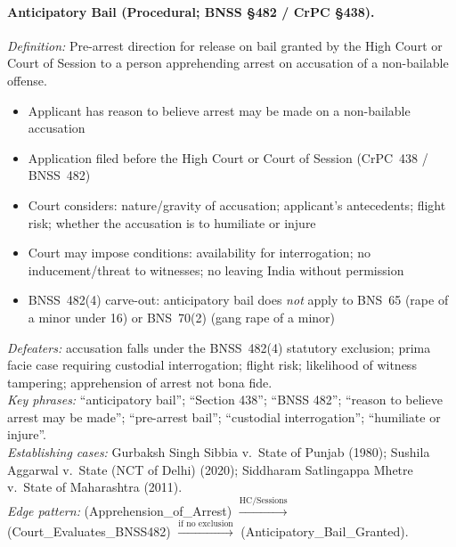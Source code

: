 \documentclass[11pt]{article}
\begin{document}
\paragraph{Anticipatory Bail (Procedural; BNSS \S482 / CrPC \S438).}
\textit{Definition:} Pre-arrest direction for release on bail granted by the High Court or Court of Session to a person apprehending arrest on accusation of a non-bailable offense.
\begin{itemize}[nosep,leftmargin=*]
  \item[\textsc{and}] Applicant has reason to believe arrest may be made on a non-bailable accusation
  \item[\textsc{and}] Application filed before the High Court or Court of Session (CrPC~438 / BNSS~482)
  \item[\textsc{and}] Court considers: nature/gravity of accusation; applicant's antecedents; flight risk; whether the accusation is to humiliate or injure
  \item[\textsc{and}] Court may impose conditions: availability for interrogation; no inducement/threat to witnesses; no leaving India without permission
  \item[\textsc{and}] BNSS~482(4) carve-out: anticipatory bail does \emph{not} apply to BNS~65 (rape of a minor under 16) or BNS~70(2) (gang rape of a minor)
\end{itemize}
\textit{Defeaters:} accusation falls under the BNSS~482(4) statutory exclusion; prima facie case requiring custodial interrogation; flight risk; likelihood of witness tampering; apprehension of arrest not bona fide.\\
\textit{Key phrases:} ``anticipatory bail''; ``Section 438''; ``BNSS 482''; ``reason to believe arrest may be made''; ``pre-arrest bail''; ``custodial interrogation''; ``humiliate or injure''.\\
\textit{Establishing cases:} Gurbaksh Singh Sibbia v.\ State of Punjab (1980); Sushila Aggarwal v.\ State (NCT of Delhi) (2020); Siddharam Satlingappa Mhetre v.\ State of Maharashtra (2011).\\
\textit{Edge pattern:} (Apprehension\_of\_Arrest) $\xrightarrow{\text{HC/Sessions}}$ (Court\_Evaluates\_BNSS482) $\xrightarrow{\text{if no exclusion}}$ (Anticipatory\_Bail\_Granted).
\end{document}
